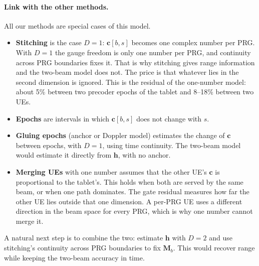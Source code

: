 \paragraph{Link with the other methods.} All our methods are special cases of this model.
\begin{itemize}
  \item \textbf{Stitching} is the case $D=1$: $\mathbf{c}[b,s]$ becomes one complex number per PRG. With $D=1$ the gauge freedom is only one number per PRG, and continuity across PRG boundaries fixes it. That is why stitching gives range information and the two-beam model does not. The price is that whatever lies in the second dimension is ignored. This is the residual of the one-number model: about 5\% between two precoder epochs of the tablet and 8--18\% between two UEs.
  \item \textbf{Epochs} are intervals in which $\mathbf{c}[b,s]$ does not change with $s$.
  \item \textbf{Gluing epochs} (anchor or Doppler model) estimates the change of $\mathbf{c}$ between epochs, with $D=1$, using time continuity. The two-beam model would estimate it directly from $\mathbf{h}$, with no anchor.
  \item \textbf{Merging UEs} with one number assumes that the other UE's $\mathbf{c}$ is proportional to the tablet's. This holds when both are served by the same beam, or when one path dominates. The gate residual measures how far the other UE lies outside that one dimension. A per-PRG UE uses a different direction in the beam space for every PRG, which is why one number cannot merge it.
\end{itemize}
A natural next step is to combine the two: estimate $\mathbf{h}$ with $D=2$ and use stitching's continuity across PRG boundaries to fix $\mathbf{M}_b$. This would recover range while keeping the two-beam accuracy in time.
